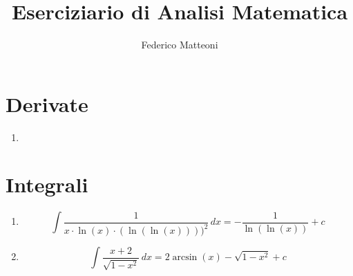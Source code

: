 \documentclass[10pt]{article}
\begin{document}
\title{Eserciziario di Analisi Matematica}
\author{Federico Matteoni}
\date{ }
\renewcommand*\contentsname{Indice}

\maketitle
\tableofcontents
\pagebreak
\section{Derivate}
	\begin{multicols}{2}
		\begin{enumerate}
			\item 
		\end{enumerate}
	\end{multicols}
\pagebreak
\section{Integrali}
	\begin{multicols}{2}
		\begin{enumerate}
			\item $$\int \frac{1}{x\cdot\ln(x)\cdot(\ln(\ln(x))))^2}\, dx = -\frac{1}{\ln(\ln(x))} + c$$
			\item $$\int \frac{x + 2}{\sqrt{1 - x^2}}\, dx = 2\arcsin(x) - \sqrt{1 - x^2} + c $$
		\end{enumerate}
	\end{multicols}
\pagebreak
\end{document}
